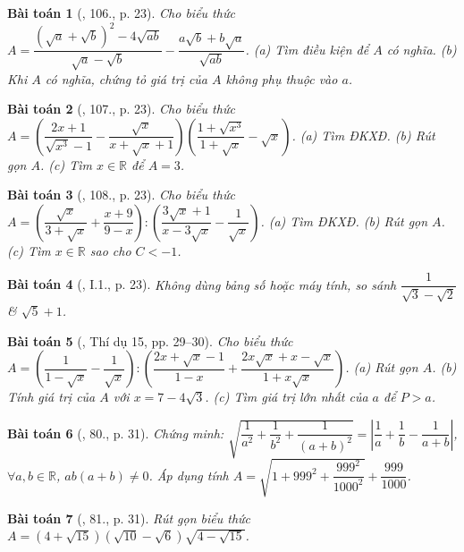 \documentclass{article}
\newtheorem{baitoan}{Bài toán}
\begin{document}
\begin{baitoan}[\cite{SBT_Toan_9_tap_1}, 106., p. 23]
	Cho biểu thức $A = \dfrac{(\sqrt{a} + \sqrt{b})^2 - 4\sqrt{ab}}{\sqrt{a} - \sqrt{b}} - \dfrac{a\sqrt{b} + b\sqrt{a}}{\sqrt{ab}}$. (a) Tìm điều kiện để $A$ có nghĩa. (b) Khi $A$ có nghĩa, chứng tỏ giá trị của $A$ không phụ thuộc vào $a$.
\end{baitoan}

\begin{baitoan}[\cite{SBT_Toan_9_tap_1}, 107., p. 23]
	Cho biểu thức $A = \left(\dfrac{2x + 1}{\sqrt{x^3} - 1} - \dfrac{\sqrt{x}}{x + \sqrt{x} + 1}\right)\left(\dfrac{1 + \sqrt{x^3}}{1 + \sqrt{x}} - \sqrt{x}\right)$. (a) Tìm ĐKXĐ. (b) Rút gọn $A$. (c) Tìm $x\in\mathbb{R}$ để $A = 3$.
\end{baitoan}

\begin{baitoan}[\cite{SBT_Toan_9_tap_1}, 108., p. 23]
	Cho biểu thức $A = \left(\dfrac{\sqrt{x}}{3 + \sqrt{x}} + \dfrac{x + 9}{9 - x}\right):\left(\dfrac{3\sqrt{x} + 1}{x - 3\sqrt{x}} - \dfrac{1}{\sqrt{x}}\right)$. (a) Tìm ĐKXĐ. (b) Rút gọn $A$. (c) Tìm $x\in\mathbb{R}$ sao cho $C < -1$.
\end{baitoan}

\begin{baitoan}[\cite{SBT_Toan_9_tap_1}, I.1., p. 23]
	Không dùng bảng số hoặc máy tính, so sánh $\dfrac{1}{\sqrt{3} - \sqrt{2}}$ \& $\sqrt{5} + 1$.
\end{baitoan}

\begin{baitoan}[\cite{Tuyen_Toan_9}, Thí dụ 15, pp. 29--30]
	Cho biểu thức $A = \left(\dfrac{1}{1 - \sqrt{x}} - \dfrac{1}{\sqrt{x}}\right):\left(\dfrac{2x + \sqrt{x} - 1}{1 - x} + \dfrac{2x\sqrt{x} + x - \sqrt{x}}{1 + x\sqrt{x}}\right)$. (a) Rút gọn $A$. (b) Tính giá trị của $A$ với $x = 7 - 4\sqrt{3}$. (c) Tìm giá trị lớn nhất của $a$ để $P > a$.
\end{baitoan}

\begin{baitoan}[\cite{Tuyen_Toan_9}, 80., p. 31]
	Chứng minh: $\sqrt{\dfrac{1}{a^2} + \dfrac{1}{b^2} + \dfrac{1}{(a + b)^2}} = \left|\dfrac{1}{a} + \dfrac{1}{b} - \dfrac{1}{a + b}\right|$, $\forall a,b\in\mathbb{R}$, $ab(a + b)\ne0$. Áp dụng tính $A = \sqrt{1 + 999^2 + \dfrac{999^2}{1000^2}} + \dfrac{999}{1000}$.
\end{baitoan}

\begin{baitoan}[\cite{Tuyen_Toan_9}, 81., p. 31]
	Rút gọn biểu thức $A = (4 + \sqrt{15})(\sqrt{10} - \sqrt{6})\sqrt{4 - \sqrt{15}}$.
\end{baitoan}
\end{document}
